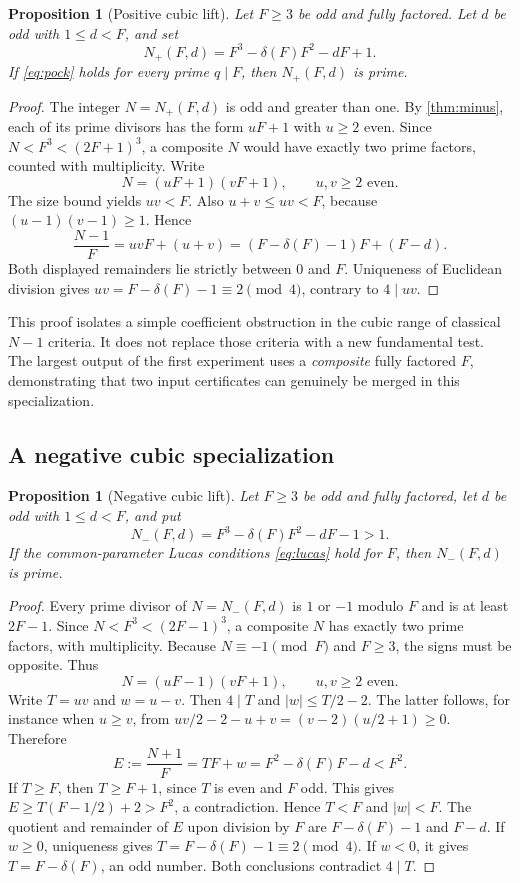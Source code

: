 \documentclass[11pt,a4paper]{article}
\newtheorem{proposition}[theorem]{Proposition}
\theoremstyle{definition}\newtheorem{definition}[theorem]{Definition}
\theoremstyle{remark}\newtheorem{remark}[theorem]{Remark}
\begin{document}
\begin{proposition}[Positive cubic lift]\label{prop:positive}
Let $F\ge3$ be odd and fully factored. Let $d$ be odd with $1\le d<F$, and set
\[
 N_+(F,d)=F^3-\delta(F)F^2-dF+1.
\]
If \eqref{eq:pock} holds for every prime $q\mid F$, then $N_+(F,d)$ is prime.
\end{proposition}

\begin{proof}
The integer $N=N_+(F,d)$ is odd and greater than one. By
\cref{thm:minus}, each of its prime divisors has the form $uF+1$ with $u\ge2$
even. Since $N<F^3<(2F+1)^3$, a composite $N$ would have exactly two prime
factors, counted with multiplicity. Write
\[
 N=(uF+1)(vF+1),\qquad u,v\ge2\text{ even}.
\]
The size bound yields $uv<F$. Also $u+v\le uv<F$, because
$(u-1)(v-1)\ge1$. Hence
\[
 \frac{N-1}{F}=uvF+(u+v)
              =(F-\delta(F)-1)F+(F-d).
\]
Both displayed remainders lie strictly between $0$ and $F$. Uniqueness of
Euclidean division gives $uv=F-\delta(F)-1\equiv2\pmod4$, contrary to
$4\mid uv$.
\end{proof}

This proof isolates a simple coefficient obstruction in the cubic range of
classical $N-1$ criteria. It does not replace those criteria with a new
fundamental test. The largest output of the first experiment uses a
\emph{composite} fully factored $F$, demonstrating that two input certificates
can genuinely be merged in this specialization.

\subsection{A negative cubic specialization}

\begin{proposition}[Negative cubic lift]\label{prop:negative}
Let $F\ge3$ be odd and fully factored, let $d$ be odd with $1\le d<F$, and put
\[
 N_-(F,d)=F^3-\delta(F)F^2-dF-1>1.
\]
If the common-parameter Lucas conditions \eqref{eq:lucas} hold for $F$, then
$N_-(F,d)$ is prime.
\end{proposition}

\begin{proof}
Every prime divisor of $N=N_-(F,d)$ is $1$ or $-1$ modulo $F$ and is at least
$2F-1$. Since $N<F^3<(2F-1)^3$, a composite $N$ has exactly two prime factors,
with multiplicity. Because $N\equiv-1\pmod F$ and $F\ge3$, the signs must be
opposite. Thus
\[
 N=(uF-1)(vF+1),\qquad u,v\ge2\text{ even}.
\]
Write $T=uv$ and $w=u-v$. Then $4\mid T$ and
$|w|\le T/2-2$. The latter follows, for instance when $u\ge v$, from
$uv/2-2-u+v=(v-2)(u/2+1)\ge0$. Therefore
\[
 E:=\frac{N+1}{F}=TF+w=F^2-\delta(F)F-d<F^2.
\]
If $T\ge F$, then $T\ge F+1$, since $T$ is even and $F$ odd. This gives
$E\ge T(F-1/2)+2>F^2$, a contradiction. Hence $T<F$ and $|w|<F$.
The quotient and remainder of $E$ upon division by $F$ are
$F-\delta(F)-1$ and $F-d$. If $w\ge0$, uniqueness gives
$T=F-\delta(F)-1\equiv2\pmod4$. If $w<0$, it gives
$T=F-\delta(F)$, an odd number. Both conclusions contradict $4\mid T$.
\end{proof}
\end{document}
